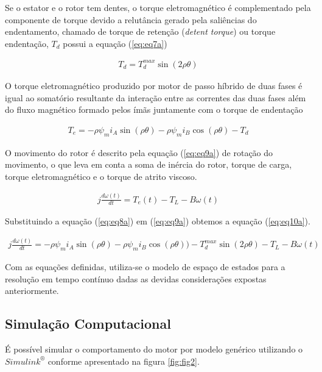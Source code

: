 Se o estator e o rotor tem dentes, o torque eletromagnético é complementado pela componente de torque devido a relutância gerado pela saliências do endentamento, chamado de torque de retenção (\textit{detent torque}) ou torque endentação, $T_d$ possui a equação (\ref{eq:eq7a})

\begin{eqnarray}
\label{eq:eq7a}
T_d = T_{d}^{max}\sin(2 \rho \theta)
\end{eqnarray}

O torque eletromagnético produzido por motor de passo híbrido de duas fases é igual ao somatório resultante da interação entre as correntes das duas fases além do fluxo magnético formado pelos ímãs juntamente com o torque de endentação

\begin{eqnarray}
	\label{eq:eq8a}
	T_e = - \rho \psi_m i_A \sin(\rho \theta) - \rho \psi_m i_B \cos(\rho \theta ) - T_d
\end{eqnarray}

O movimento do rotor é descrito pela equação (\ref{eq:eq9a}) de rotação do movimento, o que leva em conta a soma de inércia do rotor, torque de carga, torque eletromagnético e o torque de atrito viscoso.

\begin{eqnarray}
\label{eq:eq9a}
j\frac{d\omega(t)}{dt} = T_e(t) - T_L - B\omega(t)
\end{eqnarray}

Substituindo a equação (\ref{eq:eq8a}) em (\ref{eq:eq9a}) obtemos a equação (\ref{eq:eq10a}).

\tiny

\begin{eqnarray}
\label{eq:eq10a}
j\frac{d\omega(t)}{dt} = - \rho \psi_m i_A \sin(\rho \theta) - \rho \psi_m i_B \cos(\rho \theta ) )- T_{d}^{max}\sin(2 \rho \theta)  - T_L - B\omega(t)
\end{eqnarray}

\normalsize

Com as equações definidas, utiliza-se o modelo de espaço de estados para a resolução em tempo contínuo dadas as devidas considerações expostas anteriormente. 



\subsection{Simulação Computacional}

É possível simular o comportamento do motor por modelo genérico utilizando o $Simulink^\circledR$ conforme apresentado na figura \ref{fig:fig2}.

